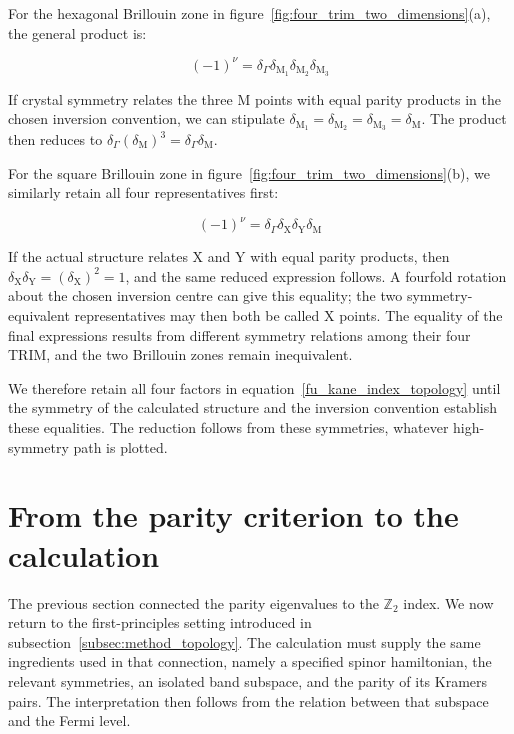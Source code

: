 For the hexagonal Brillouin zone in figure~\ref{fig:four_trim_two_dimensions}(a),
the general product is:

\begin{equation}
    (-1)^\nu
    =\delta_\Gamma\delta_{\mathrm{M}_1}
    \delta_{\mathrm{M}_2}\delta_{\mathrm{M}_3}
\label{hexagonal_trim_product_topology}
\end{equation}

If crystal symmetry relates the three $\mathrm{M}$ points with equal parity products in the chosen inversion convention,
we can stipulate $\delta_{\mathrm{M}_1}=\delta_{\mathrm{M}_2}=\delta_{\mathrm{M}_3}=\delta_\mathrm{M}$.
The product then reduces to $\delta_\Gamma(\delta_\mathrm{M})^3=\delta_\Gamma\delta_\mathrm{M}$.

For the square Brillouin zone in figure~\ref{fig:four_trim_two_dimensions}(b),
we similarly retain all four representatives first:

\begin{equation}
    (-1)^\nu
    =\delta_\Gamma\delta_\mathrm{X}\delta_\mathrm{Y}\delta_\mathrm{M}
\label{square_trim_product_topology}
\end{equation}

If the actual structure relates $\mathrm{X}$ and $\mathrm{Y}$ with equal parity products,
then $\delta_\mathrm{X}\delta_\mathrm{Y}=(\delta_\mathrm{X})^2=1$,
and the same reduced expression follows.
A fourfold rotation about the chosen inversion centre can give this equality;
the two symmetry-equivalent representatives may then both be called $\mathrm{X}$ points.
The equality of the final expressions results from different symmetry relations among their four TRIM,
and the two Brillouin zones remain inequivalent.

We therefore retain all four factors in equation~\eqref{fu_kane_index_topology} until the symmetry of the calculated structure
and the inversion convention establish these equalities.
The reduction follows from these symmetries, whatever high-symmetry path is plotted.

\newpage
\FloatBarrier
\section{From the parity criterion to the calculation}
\label{sec:interpreting_topology_calculation}

The previous section connected the parity eigenvalues to the $\mathbb{Z}_2$ index.
We now return to the first-principles setting introduced in subsection~\ref{subsec:method_topology}.
The calculation must supply the same ingredients used in that connection, namely a specified spinor hamiltonian, the relevant symmetries, an isolated band subspace, and the parity of its Kramers pairs.
The interpretation then follows from the relation between that subspace and the Fermi level.

